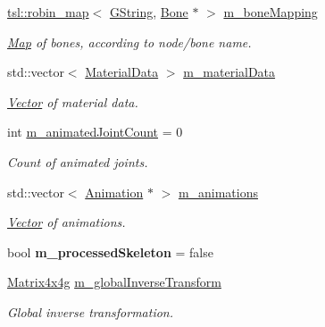 \begin{Indent}
\begin{DoxyCompactItemize}
\mbox{\hyperlink{classtsl_1_1robin__map}{tsl\+::robin\+\_\+map}}$<$ \mbox{\hyperlink{classrev_1_1_g_string}{G\+String}}, \mbox{\hyperlink{classrev_1_1_bone}{Bone}} $\ast$ $>$ \mbox{\hyperlink{classrev_1_1_model_reader_a782e5007156de58fd6b8bb4dad1ea8d3}{m\+\_\+bone\+Mapping}}
\begin{DoxyCompactList}\small\item\em \mbox{\hyperlink{classrev_1_1_map}{Map}} of bones, according to node/bone name. \end{DoxyCompactList}\item 
\mbox{\label{classrev_1_1_model_reader_a1fd30fbcfc6db3aa58ea918233a7bdd3}} 
std\+::vector$<$ \mbox{\hyperlink{structrev_1_1_material_data}{Material\+Data}} $>$ \mbox{\hyperlink{classrev_1_1_model_reader_a1fd30fbcfc6db3aa58ea918233a7bdd3}{m\+\_\+material\+Data}}
\begin{DoxyCompactList}\small\item\em \mbox{\hyperlink{classrev_1_1_vector}{Vector}} of material data. \end{DoxyCompactList}\item 
\mbox{\label{classrev_1_1_model_reader_adbb9fe3fc3389a08fbe76937369c24a5}} 
int \mbox{\hyperlink{classrev_1_1_model_reader_adbb9fe3fc3389a08fbe76937369c24a5}{m\+\_\+animated\+Joint\+Count}} = 0
\begin{DoxyCompactList}\small\item\em Count of animated joints. \end{DoxyCompactList}\item 
\mbox{\label{classrev_1_1_model_reader_aa37fbebc9b5bad690d06b4ac3a57afe9}} 
std\+::vector$<$ \mbox{\hyperlink{classrev_1_1_animation}{Animation}} $\ast$ $>$ \mbox{\hyperlink{classrev_1_1_model_reader_aa37fbebc9b5bad690d06b4ac3a57afe9}{m\+\_\+animations}}
\begin{DoxyCompactList}\small\item\em \mbox{\hyperlink{classrev_1_1_vector}{Vector}} of animations. \end{DoxyCompactList}\item 
\mbox{\label{classrev_1_1_model_reader_a5c720804d952fb2fe66e3a5d19fb0f60}} 
bool {\bfseries m\+\_\+processed\+Skeleton} = false
\item 
\mbox{\label{classrev_1_1_model_reader_ad5ccfb0435f44d147cc2590a36315d6d}} 
\mbox{\hyperlink{classrev_1_1_square_matrix}{Matrix4x4g}} \mbox{\hyperlink{classrev_1_1_model_reader_ad5ccfb0435f44d147cc2590a36315d6d}{m\+\_\+global\+Inverse\+Transform}}
\begin{DoxyCompactList}\small\item\em Global inverse transformation. \end{DoxyCompactList}\end{DoxyCompactItemize}
\end{Indent}
